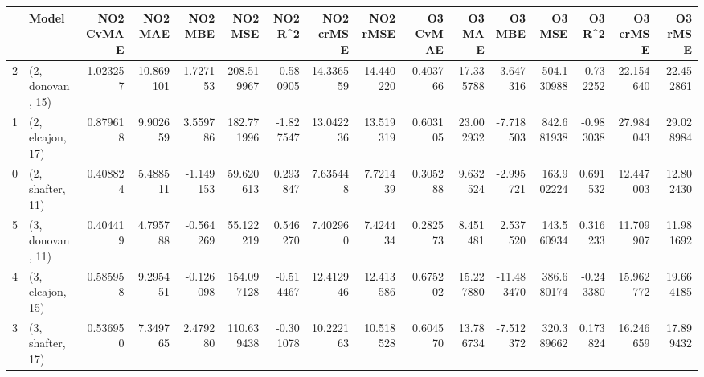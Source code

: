 \begin{tabular}{llrrrrrrrrrrrrrr}
\toprule
{} &             Model &  NO2 CvMAE &    NO2 MAE &   NO2 MBE &     NO2 MSE &   NO2 R\textasciicircum2 &  NO2 crMSE &   NO2 rMSE &  O3 CvMAE &     O3 MAE &     O3 MBE &      O3 MSE &    O3 R\textasciicircum2 &   O3 crMSE &    O3 rMSE \\
\midrule
2 &  (2, donovan, 15) &   1.023257 &  10.869101 &  1.727153 &  208.519967 & -0.580905 &  14.336559 &  14.440220 &  0.403766 &  17.335788 &  -3.647316 &  504.130988 & -0.732252 &  22.154640 &  22.452861 \\
1 &  (2, elcajon, 17) &   0.879618 &   9.902659 &  3.559786 &  182.771996 & -1.827547 &  13.042236 &  13.519319 &  0.603105 &  23.002932 &  -7.718503 &  842.681938 & -0.983038 &  27.984043 &  29.028984 \\
0 &  (2, shafter, 11) &   0.408824 &   5.488511 & -1.149153 &   59.620613 &  0.293847 &   7.635448 &   7.721439 &  0.305288 &   9.632524 &  -2.995721 &  163.902224 &  0.691532 &  12.447003 &  12.802430 \\
5 &  (3, donovan, 11) &   0.404419 &   4.795788 & -0.564269 &   55.122219 &  0.546270 &   7.402960 &   7.424434 &  0.282573 &   8.451481 &   2.537520 &  143.560934 &  0.316233 &  11.709907 &  11.981692 \\
4 &  (3, elcajon, 15) &   0.585958 &   9.295451 & -0.126098 &  154.097128 & -0.514467 &  12.412946 &  12.413586 &  0.675202 &  15.227880 & -11.483470 &  386.680174 & -0.243380 &  15.962772 &  19.664185 \\
3 &  (3, shafter, 17) &   0.536950 &   7.349765 &  2.479280 &  110.639438 & -0.301078 &  10.222163 &  10.518528 &  0.604570 &  13.786734 &  -7.512372 &  320.389662 &  0.173824 &  16.246659 &  17.899432 \\
\bottomrule
\end{tabular}
